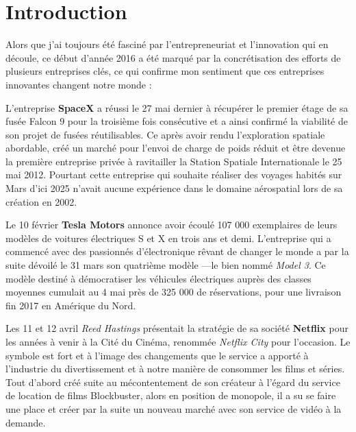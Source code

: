 \chapter{Introduction}

Alors que j'ai toujours été fasciné par l'entrepreneuriat et l'innovation qui en découle, ce début d'année 2016 a été marqué par la concrétisation des efforts de plusieurs entreprises clés, ce qui confirme mon sentiment que ces entreprises innovantes changent notre monde :

\vspace{5mm}

L'entreprise \textbf{SpaceX} a réussi le 27 mai dernier à récupérer le premier étage de sa fusée Falcon 9 pour la troisième fois consécutive\supercite{SpaceXThirdLanding} et a ainsi confirmé la viabilité de son projet de fusées réutilisables. Ce après avoir rendu l'exploration spatiale abordable, créé un marché pour l'envoi de charge de poids réduit et être devenue la première entreprise privée à ravitailler la Station Spatiale Internationale le 25 mai 2012\supercite{DragonFirstISSMission}. Pourtant cette entreprise qui souhaite réaliser des voyages habités sur Mars d'ici 2025\supercite{ElonMuskMars2020} n'avait aucune expérience dans le domaine aérospatial lors de sa création en 2002.

\vspace{5mm}

Le 10 février \textbf{Tesla Motors} annonce avoir écoulé 107 000 exemplaires de leurs modèles de voitures électriques S et X en trois ans et demi\supercite{Tesla2015FullYearUpdate}. L'entreprise  qui a commencé avec des passionnés d’électronique rêvant de changer le monde a par la suite dévoilé le 31 mars son quatrième modèle ---le bien nommé \textit{Model 3}. Ce modèle destiné à démocratiser les véhicules électriques auprès des classes moyennes cumulait au 4 mai près de 325 000 de réservations\supercite{Tesla2016Q1Update}, pour une livraison fin 2017 en Amérique du Nord.

\vspace{5mm}

Les 11 et 12 avril \textit{Reed Hastings} présentait la stratégie de sa société \textbf{Netflix} pour les années à venir à la Cité du Cinéma, renommée \textit{Netflix City} pour l'occasion. Le symbole est fort et à l'image des changements que le service a apporté à l'industrie du divertissement et à notre manière de consommer les films et séries. Tout d'abord créé suite au mécontentement de son créateur à l'égard du service de location de films Blockbuster, alors en position de monopole, il a su se faire une place et créer par la suite un nouveau marché avec son service de vidéo à la demande.

